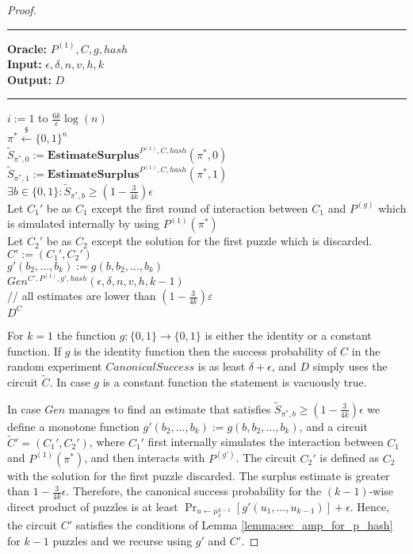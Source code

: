 \begin{proof}
\begin{codeblock}
  \medskip
  \hrule
  \medskip
  \textbf{Oracle:} $ P^{(1)}, C, g, hash$ \\
  \textbf{Input:}  $\epsilon, \delta, n, v, h, k$\\
  \textbf{Output:} $D$
  \medskip\hrule\medskip
  \For $i:=1$ to $\frac{6k}{\epsilon}\log(n)$ \Do \\
  \IndI $\pi^* \xleftarrow{\$} \{0,1\}^{n}$\\
  \IndI $\widetilde{S}_{\pi^*,0} := \textbf{EstimateSurplus}^{P^{(1)}, C, hash}(\pi^*, 0)$\\
  \IndI $\widetilde{S}_{\pi^*,1} := \textbf{EstimateSurplus}^{P^{(1)}, C, hash}(\pi^*, 1)$\\
  \IndI \If $ \exists b \in \{0,1\}: \widetilde{S}_{\pi^*,b} \geq (1 - \frac{3}{4k}) \epsilon$ \then \\
  \IndII Let $C_1'$ be as $C_1$ except the first round of interaction between $C_1$ and $P^{(g)}$ which \\
  \IndII is simulated internally by using $P^{(1)}(\pi^*)$\\
  \IndII Let $C_2'$ be as $C_2$ except the solution for the first puzzle which is discarded. \\
  \IndII $C' := (C_1', C_2')$ \\
  \IndII $g'(b_2, \dots, b_k) := g(b, b_2, \dots, b_k)$\\
  \IndII\return $Gen^{C', P^{(1)}, g', hash}(\epsilon, \delta, n, v, h, k-1)$ \\
  // all estimates are lower than $(1-\frac{3}{4k})\varepsilon$\\
  \return $D^{C}$
\end{codeblock}
For $k=1$ the function $g: \{0,1\} \rightarrow \{0,1\}$ is either the identity or a constant function.
If $g$ is the identity function then the success probability of $C$ in the random experiment $CanonicalSuccess$ is as least $\delta + \epsilon$,
and $D$ simply uses the circuit $\widetilde{C}$. In case $g$ is a constant function the statement is vacuously true.

In case $Gen$ manages to find an estimate that satisfies $\widetilde{S}_{\pi^*,b} \geq (1-\frac{3}{4k})\epsilon$
we define a monotone function $g'(b_2, \dots, b_k) := g(b, b_2, \dots, b_k)$,
and a circuit $\widetilde{C}' = (C_1', C_2')$, where
$C_1'$ first internally simulates the interaction between $C_1$ and $P^{(1)}(\pi^*)$, and then interacts with $P^{(g')}$.
The circuit $C_2'$ is defined as $C_2$ with the solution for the first puzzle discarded.
The surplus estimate is greater than $1 - \frac{3}{4k}\epsilon$.
Therefore, the canonical success probability for the $(k-1)$-wise direct product of puzzles is at least $\Pr_{u \leftarrow \mu^{k-1}_{\delta}}[g'(u_1,\dots, u_{k-1} )] + \epsilon$.
Hence, the circuit $C'$ satisfies the conditions of Lemma \ref{lemma:sec_amp_for_p_hash} for $k-1$ puzzles and we recurse using $g'$ and $C'$.


\end{proof}
